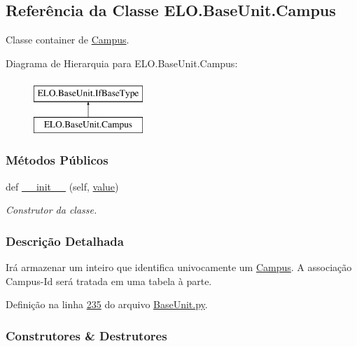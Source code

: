 \hypertarget{classELO_1_1BaseUnit_1_1Campus}{}\subsection{Referência da Classe E\+L\+O.\+Base\+Unit.\+Campus}
\label{classELO_1_1BaseUnit_1_1Campus}


Classe container de \hyperlink{classELO_1_1BaseUnit_1_1Campus}{Campus}.  


Diagrama de Hierarquia para E\+L\+O.\+Base\+Unit.\+Campus\+:\begin{figure}[H]
\begin{center}
\leavevmode
\includegraphics[height=2.000000cm]{d4/d76/classELO_1_1BaseUnit_1_1Campus}
\end{center}
\end{figure}
\subsubsection*{Métodos Públicos}
\begin{DoxyCompactItemize}
\item 
def \hyperlink{classELO_1_1BaseUnit_1_1Campus_ac16ebb4409f821d7787fe9127306b1d0}{\+\_\+\+\_\+init\+\_\+\+\_\+} (self, \hyperlink{classELO_1_1BaseUnit_1_1IfBaseType_a2534c3548a8e5991dde0a64b4f0b542b}{value})
\begin{DoxyCompactList}\small\item\em Construtor da classe. \end{DoxyCompactList}\end{DoxyCompactItemize}


\subsubsection{Descrição Detalhada}
Irá armazenar um inteiro que identifica univocamente um \hyperlink{classELO_1_1BaseUnit_1_1Campus}{Campus}. A associação Campus-\/\+Id será tratada em uma tabela à parte. 

Definição na linha \hyperlink{BaseUnit_8py_source_l00235}{235} do arquivo \hyperlink{BaseUnit_8py_source}{Base\+Unit.\+py}.



\subsubsection{Construtores \& Destrutores}
\hypertarget{classELO_1_1BaseUnit_1_1Campus_ac16ebb4409f821d7787fe9127306b1d0}{}
